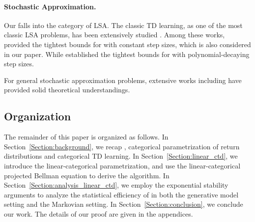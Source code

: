 \paragraph{Stochastic Approximation.}
Our {\LCTD} falls into the category of LSA. 
The classic TD learning, as one of the most classic LSA problems, has been extensively studied \citep{bertsekas1995neuro, tsitsiklis1996analysis, bhandari2018finite, dalal2018finite, patil2023finite,duan2023finite,li2024q,li2024high,samsonov2024gaussian, wu2024statistical}. 
Among these works, \cite{li2024high,samsonov2024improved} provided the tightest bounds for {\LTD} with constant step sizes, which is also considered in our paper.
While \cite{wu2024statistical} established the tightest bounds for {\LTD} with polynomial-decaying step sizes.

For general stochastic approximation problems, extensive works including \citep{lakshminarayanan2018linear,srikant2019finite,mou2020linear,mou2022optimal,huo2023bias,li2023online,durmus2024finite,samsonov2024improved, chen2024lyapunov} have provided solid theoretical understandings.

\subsection{Organization}
The remainder of this paper is organized as follows. 
In Section~\ref{Section:background}, we recap {\LTD}, categorical parametrization of return distributions and categorical TD learning.
In Section~\ref{Section:linear_ctd}, we introduce the linear-categorical parametrization, and use the linear-categorical projected Bellman equation to derive the {\LCTD} algorithm.
In Section~\ref{Section:analysis_linear_ctd}, we employ the exponential stability arguments to analyze the statistical efficiency of {\LCTD} in both the generative model setting and the Markovian setting.
In Section~\ref{Section:conclusion}, we conclude our work. 
The details of our proof are given in the appendices.